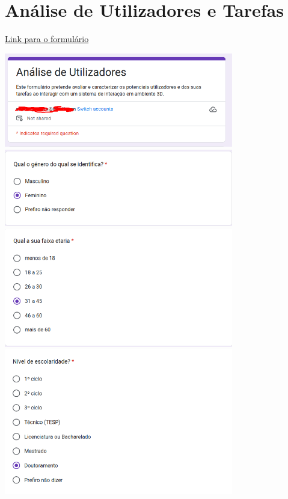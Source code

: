 \documentclass[a4paper,12pt]{article}
\begin{document}
\newpage
\section{Análise de Utilizadores e Tarefas}

\begin{center}
    \textcolor{linkblue}{\href{https://forms.gle/mGgTZJcjzfStsLvn6}{Link para o formulário}}

    \vspace{0.3cm}
    \includegraphics[width=0.75\textwidth]{form/intro_form.png}
    \includegraphics[width=0.75\textwidth]{form/01questao_genero.png}
    \includegraphics[width=0.75\textwidth]{form/02questao_idade.png}
    \includegraphics[width=0.75\textwidth]{form/03questao_escolaridade.png}

\end{center}
\end{document}
